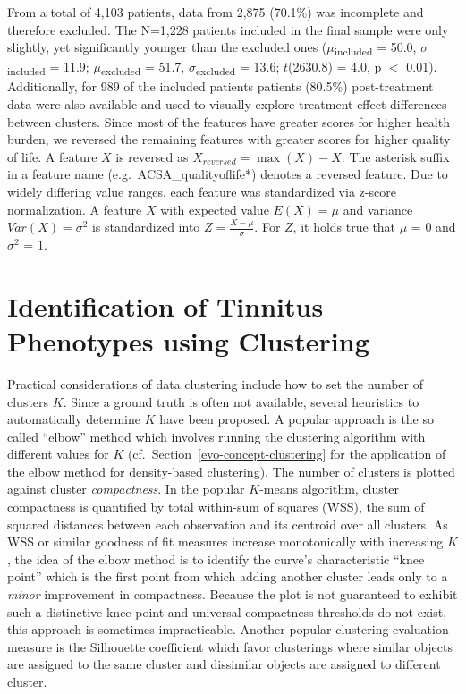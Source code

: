 \documentclass[
  oneside]{book}
\begin{document}
From a total of 4,103 patients, data from 2,875 (70.1\%) was incomplete and therefore excluded.
The N=1,228 patients included in the final sample were only slightly, yet significantly younger than the excluded ones (\(\mu\)\textsubscript{included} = 50.0, \(\sigma\)\textsubscript{included} = 11.9; \(\mu\)\textsubscript{excluded} = 51.7, \(\sigma\)\textsubscript{excluded} = 13.6; \(t\)(2630.8) = 4.0, p \(<\) 0.01).
Additionally, for 989 of the included patients patients (80.5\%) post-treatment data were also available and used to visually explore treatment effect differences between clusters.
Since most of the features have greater scores for higher health burden, we reversed the remaining features with greater scores for higher quality of life.
A feature \(X\) is reversed as \(X_{reversed} = \max{(X)} - X\).
The asterisk suffix in a feature name (e.g.~ACSA\_qualityoflife*) denotes a reversed feature.
Due to widely differing value ranges, each feature was standardized via z-score normalization.
A feature \(X\) with expected value \(E(X)=\mu\) and variance \(Var(X) = \sigma^2\) is standardized into \(Z = \frac{X - \mu}{\sigma}\).
For \(Z\), it holds true that \(\mu\) = 0 and \(\sigma^2\) = 1.

\hypertarget{phenotypes-xmeans}{%
\section{Identification of Tinnitus Phenotypes using Clustering}\label{phenotypes-xmeans}}

Practical considerations of data clustering include how to set the number of clusters \(K\).
Since a ground truth is often not available, several heuristics to automatically determine \(K\) have been proposed.
A popular approach is the so called ``elbow'' method which involves running the clustering algorithm with different values for \(K\) (cf.~Section~\ref{evo-concept-clustering} for the application of the elbow method for density-based clustering).
The number of clusters is plotted against cluster \emph{compactness}.
In the popular \(K\)-means algorithm, cluster compactness is quantified by total within-sum of squares (WSS), the sum of squared distances between each observation and its centroid over all clusters.
As WSS or similar goodness of fit measures increase monotonically with increasing \(K\), the idea of the elbow method is to identify the curve's characteristic ``knee point'' which is the first point from which adding another cluster leads only to a \emph{minor} improvement in compactness.
Because the plot is not guaranteed to exhibit such a distinctive knee point and universal compactness thresholds do not exist, this approach is sometimes impracticable.
Another popular clustering evaluation measure is the Silhouette coefficient which favor clusterings where similar objects are assigned to the same cluster and dissimilar objects are assigned to different cluster.
\end{document}
